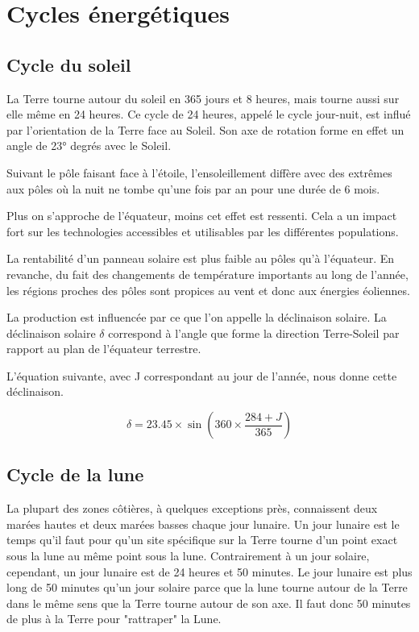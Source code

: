 \chapter{Cycles énergétiques}
\section{Cycle du soleil}

La Terre tourne autour du soleil en 365 jours et 8 heures, mais tourne aussi sur elle même en 24 heures.
Ce cycle de 24 heures, appelé le cycle jour-nuit, est influé par l'orientation de la Terre face au Soleil.
Son axe de rotation forme en effet un angle de 23° degrés avec le Soleil.

Suivant le pôle faisant face à l'étoile, l'ensoleillement diffère avec des extrêmes aux pôles où la nuit ne tombe
qu'une fois par an pour une durée de 6 mois.

Plus on s'approche de l'équateur, moins cet effet est ressenti. Cela a un impact fort sur les technologies
accessibles et utilisables par les différentes populations.

La rentabilité d'un panneau solaire est plus faible au pôles qu'à l'équateur.
En revanche, du fait des changements de température importants au long de l'année, les régions proches des pôles
sont propices au vent et donc aux énergies éoliennes.

La production est influencée par ce que l'on appelle la déclinaison solaire.
La déclinaison solaire $\delta$ correspond à l’angle que forme la direction
Terre-Soleil par rapport au plan de l’équateur terrestre.

L'équation suivante, avec J correspondant au jour de l'année, nous donne cette déclinaison.

\begin{equation}
  \delta = 23.45 \times \sin \left( 360 \times \frac{284 + J}{365} \right)
\end{equation}

\section{Cycle de la lune}

La plupart des zones côtières, à quelques exceptions près, connaissent deux marées hautes et deux marées basses chaque jour lunaire.
Un jour lunaire est le temps qu'il faut pour qu'un site spécifique sur la Terre tourne d'un point exact sous la lune au même point sous la lune.
Contrairement à un jour solaire, cependant, un jour lunaire est de 24 heures et 50 minutes.
Le jour lunaire est plus long de 50 minutes qu'un jour solaire parce que la lune tourne autour de la Terre dans le même sens
que la Terre tourne autour de son axe.
Il faut donc 50 minutes de plus à la Terre pour "rattraper" la Lune.

